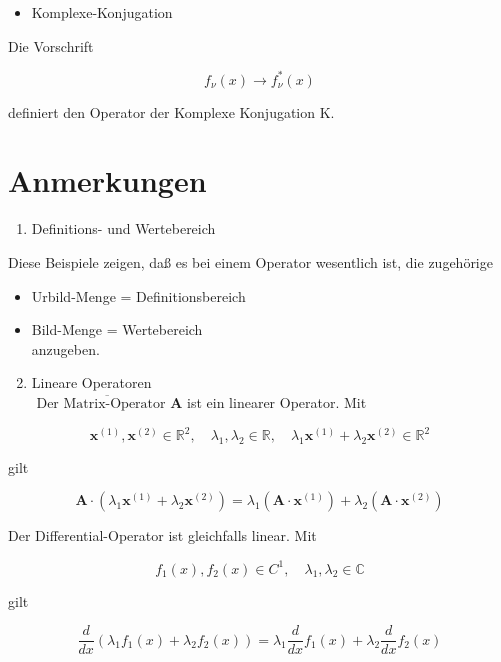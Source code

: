 \documentclass[10pt, letterpaper]{article}
\begin{document}
\begin{itemize}
  \item Komplexe-Konjugation
\end{itemize}

Die Vorschrift

$$
f_{\nu}(x) \rightarrow f_{\nu}^{*}(x)
$$

definiert den Operator der Komplexe Konjugation K.

\section*{Anmerkungen}
\begin{enumerate}
  \item Definitions- und Wertebereich
\end{enumerate}

Diese Beispiele zeigen, daß es bei einem Operator wesentlich ist, die zugehörige

\begin{itemize}
  \item Urbild-Menge = Definitionsbereich
  \item Bild-Menge = Wertebereich\\
anzugeben.
\end{itemize}

\begin{enumerate}
  \setcounter{enumi}{1}
  \item Lineare Operatoren\\
$\overline{\text { Der Matrix-Operator } \mathbf{A}}$ ist ein linearer Operator. Mit
\end{enumerate}

$$
\mathbf{x}^{(1)}, \mathbf{x}^{(2)} \in \mathbb{R}^{2}, \quad \lambda_{1}, \lambda_{2} \in \mathbb{R}, \quad \lambda_{1} \mathbf{x}^{(1)}+\lambda_{2} \mathbf{x}^{(2)} \in \mathbb{R}^{2}
$$

gilt

$$
\mathbf{A} \cdot\left(\lambda_{1} \mathbf{x}^{(1)}+\lambda_{2} \mathbf{x}^{(2)}\right)=\lambda_{1}\left(\mathbf{A} \cdot \mathbf{x}^{(1)}\right)+\lambda_{2}\left(\mathbf{A} \cdot \mathbf{x}^{(2)}\right)
$$

Der Differential-Operator ist gleichfalls linear. Mit

$$
f_{1}(x), f_{2}(x) \in C^{1}, \quad \lambda_{1}, \lambda_{2} \in \mathbb{C}
$$

gilt

$$
\frac{d}{d x}\left(\lambda_{1} f_{1}(x)+\lambda_{2} f_{2}(x)\right)=\lambda_{1} \frac{d}{d x} f_{1}(x)+\lambda_{2} \frac{d}{d x} f_{2}(x)
$$
\end{document}
